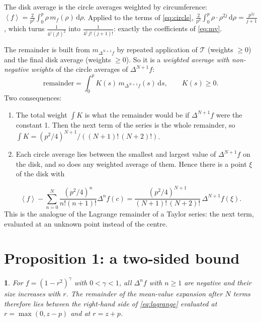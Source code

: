\documentclass[11pt,a4paper]{article}
\newtheorem*{paperthm}{\paperthmname}
\newcommand{\paperthmname}{}
\theoremstyle{remark}
\newcommand{\avg}[1]{\left\langle #1 \right\rangle}
\newcommand{\dd}{\mathrm{d}}
\begin{document}
The disk average is the circle averages weighted by circumference:
$\avg{f}=\frac{2}{p^2}\int_0^p\rho\,m_f(\rho)\,\dd\rho$. Applied to the terms of \eqref{eq:circle},
$\frac{2}{p^2}\int_0^p\rho\cdot\rho^{2j}\,\dd\rho=\frac{p^{2j}}{j+1}$, which turns
$\frac{1}{4^j(j!)^2}$ into $\frac{1}{4^j\,j!\,(j+1)!}$: exactly the coefficients of \eqref{eq:mv}.

The remainder is built from $m_{\Delta^{N+1}f}$ by repeated application of $\mathcal T$ (weights
$\ge0$) and the final disk average (weights $\ge0$). So it is a \emph{weighted average with
non-negative weights} of the circle averages of $\Delta^{N+1}f$:
\[
  \text{remainder}=\int_0^pK(s)\,m_{\Delta^{N+1}f}(s)\,\dd s,\qquad K(s)\ge0 .
\]
Two consequences:
\begin{enumerate}
  \item The total weight $\int K$ is what the remainder would be if $\Delta^{N+1}f$ were the
        constant 1. Then the next term of the series is the whole remainder, so
        $\int K=(p^2/4)^{N+1}/((N+1)!\,(N+2)!)$.
  \item Each circle average lies between the smallest and largest value of $\Delta^{N+1}f$ on the
        disk, and so does any weighted average of them. Hence there is a point $\xi$ of the disk
        with
\end{enumerate}
\begin{equation}
  \avg{f}-\sum_{n=0}^{N}\frac{(p^2/4)^n}{n!(n+1)!}\Delta^nf(c)
  =\frac{(p^2/4)^{N+1}}{(N+1)!\,(N+2)!}\,\Delta^{N+1}f(\xi).
  \label{eq:lagrange}
\end{equation}
This is the analogue of the Lagrange remainder of a Taylor series: the next term, evaluated at an
unknown point instead of the centre.

\section{Proposition 1: a two-sided bound}

\renewcommand{\paperthmname}{Proposition 1 (as in the paper)}
\begin{paperthm}
For $f=(1-r^2)^\gamma$ with $0<\gamma<1$, all $\Delta^nf$ with $n\ge1$ are negative and their size
increases with $r$. The remainder of the mean-value expansion after $N$ terms therefore lies between
the right-hand side of \eqref{eq:lagrange} evaluated at $r=\max(0,z-p)$ and at $r=z+p$.
\end{paperthm}
\end{document}

